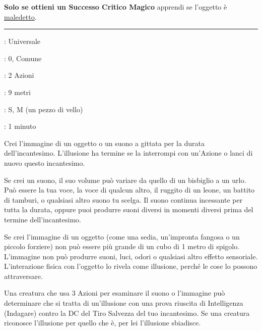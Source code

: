 \begin{multicols}{2}
\textbf{Solo se ottieni un Successo Critico Magico} apprendi se l'oggetto è \hyperlink{oggettimaledettiid}{maledetto}.

\smallskip\noindent\rule{\linewidth}{2pt} \hypertarget{Illusione Minore}{}\medskip{}
\noindent
\begin{description}[noitemsep, topsep=0pt, parsep=0pt, partopsep=0pt, leftmargin=0cm, labelwidth=2.8cm]
	\item[\textbf{Lista di Magia}]: Universale
	\item[\textbf{Livello}]: 0, Comune
	\item[\textbf{T. di Lancio}]: 2 Azioni
	\item[\textbf{Gittata}]: 9 metri
	\item[\textbf{Componenti}]: S, M (un pezzo di vello)
	\item[\textbf{Durata}]: 1 minuto
\end{description}

Crei l'immagine di un oggetto o un suono a gittata per la durata dell'incantesimo. L'illusione ha termine se la interrompi con un'Azione o lanci di nuovo questo incantesimo.

Se crei un suono, il suo volume può variare da quello di un bisbiglio a un urlo. Può essere la tua voce, la voce di qualcun altro, il ruggito di un leone, un battito di tamburi, o qualsiasi altro suono tu scelga. Il suono continua incessante per tutta la durata, oppure puoi produrre suoni diversi in momenti diversi prima del termine dell'incantesimo.

Se crei l'immagine di un oggetto (come una sedia, un'impronta fangosa o un piccolo forziere) non può essere più grande di un cubo di 1 metro di spigolo. L'immagine non può produrre suoni, luci, odori o qualsiasi altro effetto sensoriale. L'interazione fisica con l'oggetto lo rivela come illusione, perché le cose lo possono attraversare.

Una creatura che usa 3 Azioni per esaminare il suono o l'immagine può determinare che si tratta di un'illusione con una prova riuscita di Intelligenza (Indagare) contro la DC del Tiro Salvezza del tuo incantesimo. Se una creatura riconosce l'illusione per quello che è, per lei l'illusione sbiadisce.


\end{multicols}
